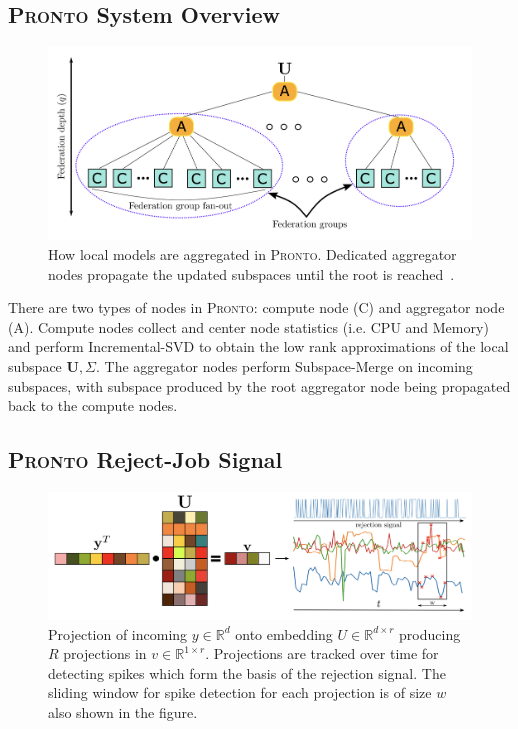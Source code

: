 \subsection{\protect\textsc{Pronto} System Overview}
\begin{figure}[ht]
    \centering
    \includegraphics[width=\textwidth]{images/pronto-agg.png}
    \caption{How local models are aggregated in \textsc{Pronto}. Dedicated aggregator
    nodes propagate the updated subspaces until the root is reached~\cite{grammenos_pronto_2021}.}
    \label{pronto-agg}
\end{figure}
There are two types of nodes in \textsc{Pronto}: compute node (C) and aggregator node
(A). Compute nodes collect and center node statistics (i.e. CPU and Memory) and
perform Incremental-SVD to obtain the low rank approximations of the local
subspace $\mathbf{U},\Sigma$. The aggregator nodes perform Subspace-Merge on
incoming subspaces, with subspace produced by the root aggregator node being
propagated back to the compute nodes.

\subsection{\protect\textsc{Pronto} Reject-Job Signal}
\begin{figure}[ht]
    \centering
    \includegraphics[width=\textwidth]{images/pronto}
    \caption{Projection of incoming $y \in \mathbb{R}^d$ onto embedding $U \in
    \mathbb{R}^{d \times r}$ producing $R$ projections in $v \in \mathbb{R}^{1
    \times r}$. Projections are tracked over time for detecting spikes which
    form the basis of the rejection signal. The sliding window for spike
    detection for each projection is of size $w$ also shown in the figure.}
    \label{pronto-components}
\end{figure}

